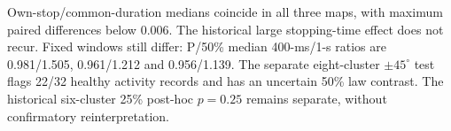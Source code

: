 Own-stop/common-duration medians coincide in all three maps, with maximum paired differences below 0.006. The historical large stopping-time effect does not recur. Fixed windows still differ: P/50\% median 400-ms/1-s ratios are 0.981/1.505, 0.961/1.212 and 0.956/1.139. The separate eight-cluster $\pm45^\circ$ test flags 22/32 healthy activity records and has an uncertain 50\% law contrast. The historical six-cluster 25\% post-hoc $p=0.25$ remains separate, without confirmatory reinterpretation.
